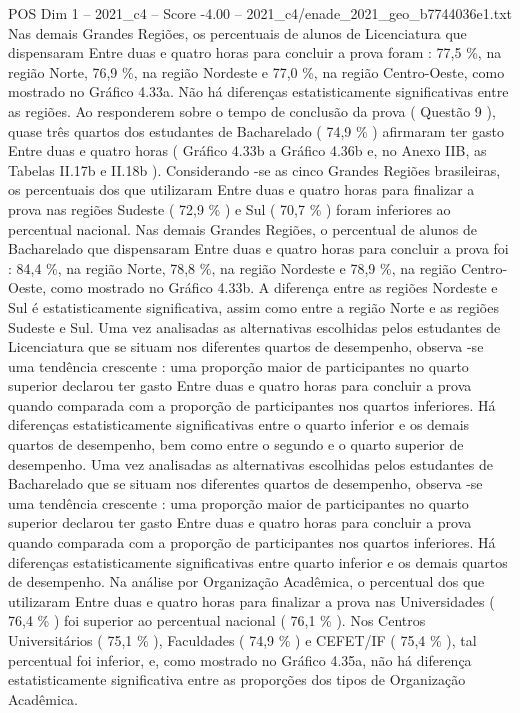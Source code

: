 \begin{textsample}{POS Dim 1 – 2021\_c4 – Score -4.00 – 2021\_c4/enade\_2021\_geo\_b7744036e1.txt}
Nas demais Grandes Regiões, os percentuais de alunos de Licenciatura que dispensaram Entre duas e quatro horas para concluir a prova foram : 77,5 \%, na região Norte, 76,9 \%, na região Nordeste e 77,0 \%, na região Centro-Oeste, como mostrado no Gráfico 4.33a.
Não há diferenças estatisticamente significativas entre as regiões.
Ao responderem sobre o tempo de conclusão da prova ( Questão 9 ), quase três quartos dos estudantes de Bacharelado ( 74,9 \% ) afirmaram ter gasto Entre duas e quatro horas ( Gráfico 4.33b a Gráfico 4.36b e, no Anexo IIB, as Tabelas II.17b e II.18b ).
Considerando -se as cinco Grandes Regiões brasileiras, os percentuais dos que utilizaram Entre duas e quatro horas para finalizar a prova nas regiões Sudeste ( 72,9 \% ) e Sul ( 70,7 \% ) foram inferiores ao percentual nacional.
Nas demais Grandes Regiões, o percentual de alunos de Bacharelado que dispensaram Entre duas e quatro horas para concluir a prova foi : 84,4 \%, na região Norte, 78,8 \%, na região Nordeste e 78,9 \%, na região Centro-Oeste, como mostrado no Gráfico 4.33b.
A diferença entre as regiões Nordeste e Sul é estatisticamente significativa, assim como entre a região Norte e as regiões Sudeste e Sul.
Uma vez analisadas as alternativas escolhidas pelos estudantes de Licenciatura que se situam nos diferentes quartos de desempenho, observa -se uma tendência crescente : uma proporção maior de participantes no quarto superior declarou ter gasto Entre duas e quatro horas para concluir a prova quando comparada com a proporção de participantes nos quartos inferiores.
Há diferenças estatisticamente significativas entre o quarto inferior e os demais quartos de desempenho, bem como entre o segundo e o quarto superior de desempenho.
Uma vez analisadas as alternativas escolhidas pelos estudantes de Bacharelado que se situam nos diferentes quartos de desempenho, observa -se uma tendência crescente : uma proporção maior de participantes no quarto superior declarou ter gasto Entre duas e quatro horas para concluir a prova quando comparada com a proporção de participantes nos quartos inferiores.
Há diferenças estatisticamente significativas entre quarto inferior e os demais quartos de desempenho.
Na análise por Organização Acadêmica, o percentual dos que utilizaram Entre duas e quatro horas para finalizar a prova nas Universidades ( 76,4 \% ) foi superior ao percentual nacional ( 76,1 \% ).
Nos Centros Universitários ( 75,1 \% ), Faculdades ( 74,9 \% ) e CEFET/IF ( 75,4 \% ), tal percentual foi inferior, e, como mostrado no Gráfico 4.35a, não há diferença estatisticamente significativa entre as proporções dos tipos de Organização Acadêmica.

\end{textsample}
